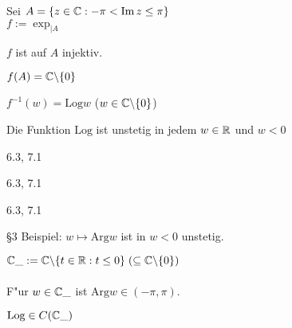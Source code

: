 \documentclass[a4paper,twoside,DIV15,BCOR12mm]{scrbook}
\def\Arg{\text{Arg}}
\def\Log{\text{Log}}
\begin{document}
\begin{satz} %
Sei $A = \{z \in \mathbb{C} : -\pi < \mathop{\rm Im}\nolimits z \leq \pi\}$ \\
$f := \exp _{|A}$
\begin{liste}
\item $f$ ist auf $A$ injektiv.
\item $f(A) = \mathbb{C}\backslash\{0\}$
\item $f^{-1}(w) = \Log w$ ($w \in \mathbb{C}\backslash\{0\}$)
\item Die Funktion $\Log$ ist unstetig in jedem $w \in \mathbb{R}$ und $w < 0$
\end{liste}
\end{satz}

\begin{beweis}
\begin{liste}
\item 6.3, 7.1
\item 6.3, 7.1
\item 6.3, 7.1
\item §3 Beispiel: $w \mapsto \Arg w$ ist in $w < 0$ unstetig.
\end{liste}
\end{beweis}



\begin{definition}
$\mathbb{C}\_ := \mathbb{C} \backslash \{ t \in \mathbb{R}: t \leq 0 \} \; (\subseteq \mathbb{C} \backslash \{0\})$\\
\\
F"ur $w \in \mathbb{C}\_$ ist $\Arg w \in (-\pi,\pi)$.
\end{definition}

\begin{satz}
$\Log \in C(\MdC\_)$
\end{satz}
\end{document}
